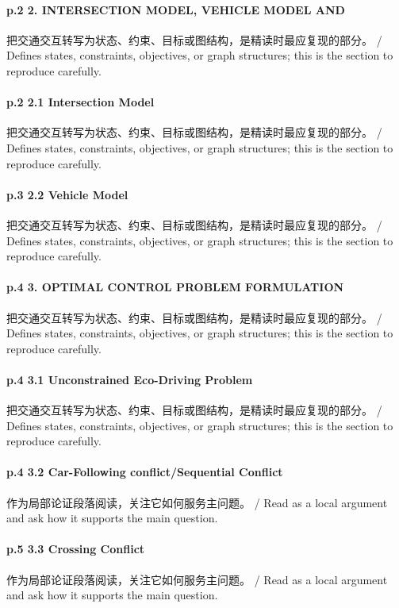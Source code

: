 \documentclass[UTF8,a4paper,11pt,fontset=fandol]{ctexart}
\begin{document}
\paragraph{p.2 2. INTERSECTION MODEL, VEHICLE MODEL AND}把交通交互转写为状态、约束、目标或图结构，是精读时最应复现的部分。 / Defines states, constraints, objectives, or graph structures; this is the section to reproduce carefully.

\paragraph{p.2 2.1 Intersection Model}把交通交互转写为状态、约束、目标或图结构，是精读时最应复现的部分。 / Defines states, constraints, objectives, or graph structures; this is the section to reproduce carefully.

\paragraph{p.3 2.2 Vehicle Model}把交通交互转写为状态、约束、目标或图结构，是精读时最应复现的部分。 / Defines states, constraints, objectives, or graph structures; this is the section to reproduce carefully.

\paragraph{p.4 3. OPTIMAL CONTROL PROBLEM FORMULATION}把交通交互转写为状态、约束、目标或图结构，是精读时最应复现的部分。 / Defines states, constraints, objectives, or graph structures; this is the section to reproduce carefully.

\paragraph{p.4 3.1 Unconstrained Eco-Driving Problem}把交通交互转写为状态、约束、目标或图结构，是精读时最应复现的部分。 / Defines states, constraints, objectives, or graph structures; this is the section to reproduce carefully.

\paragraph{p.4 3.2 Car-Following conﬂict/Sequential Conﬂict}作为局部论证段落阅读，关注它如何服务主问题。 / Read as a local argument and ask how it supports the main question.

\paragraph{p.5 3.3 Crossing Conﬂict}作为局部论证段落阅读，关注它如何服务主问题。 / Read as a local argument and ask how it supports the main question.
\end{document}
